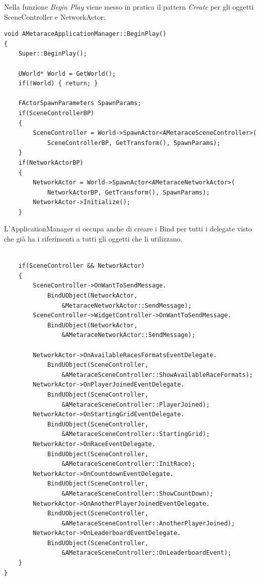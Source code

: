     Nella funzione \textit{Begin Play} viene messo in pratica il pattern \textit{Create} per gli oggetti SceneController e NetworkActor:

    \begin{lstlisting}[caption = Sezione del file source dell'Application Manager dove vengono creati gli oggetti SceneController e NetworkActor]
void AMetaraceApplicationManager::BeginPlay()
{
    Super::BeginPlay();

    UWorld* World = GetWorld();
    if(!World) { return; }

    FActorSpawnParameters SpawnParams;
    if(SceneControllerBP)
    {
        SceneController = World->SpawnActor<AMetaraceSceneController>(
            SceneControllerBP, GetTransform(), SpawnParams);
    }
    if(NetworkActorBP)
    {
        NetworkActor = World->SpawnActor<AMetaraceNetworkActor>(
            NetworkActorBP, GetTransform(), SpawnParams);
        NetworkActor->Initialize();
    }

    \end{lstlisting}

    L'ApplicationManager si occupa anche di creare i Bind per tutti i delegate visto che già ha i riferimenti a tutti gli oggetti che li utilizzano.

    \label{alg:bindDelegate}
    \begin{lstlisting}[firstnumber=22, caption = Sezione del file source dell'Application Manager dove viene formato il Bind dei delegates]

    if(SceneController && NetworkActor)
    {
        SceneController->OnWantToSendMessage.
            BindUObject(NetworkActor, 
                &MetaraceNetworkActor::SendMessage);
        SceneController->WidgetController->OnWantToSendMessage.
            BindUObject(NetworkActor, 
                &AMetaraceNetworkActor::SendMessage);

        NetworkActor->OnAvailableRacesFormatsEventDelegate.
            BindUObject(SceneController,
                &AMetaraceSceneController::ShowAvailableRaceFormats);
        NetworkActor->OnPlayerJoinedEventDelegate.
            BindUObject(SceneController,
                &AMetaraceSceneController::PlayerJoined);
        NetworkActor->OnStartingGridEventDelegate.
            BindUObject(SceneController,
                &AMetaraceSceneController::StartingGrid);
        NetworkActor->OnRaceEventDelegate.
            BindUObject(SceneController,
                &AMetaraceSceneController::InitRace);
        NetworkActor->OnCountdownEventDelegate.
            BindUObject(SceneController,
                &AMetaraceSceneController::ShowCountDown);
        NetworkActor->OnAnotherPlayerJoinedEventDelegate.
            BindUObject(SceneController,
                &AMetaraceSceneController::AnotherPlayerJoined);
        NetworkActor->OnLeaderboardEventDelegate.
            BindUObject(SceneController,
                &AMetaraceSceneController::OnLeaderboardEvent);
    }
}        
    \end{lstlisting}

